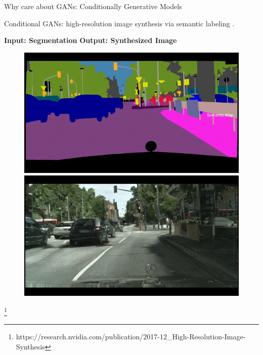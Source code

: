 \documentclass[notheorems]{beamer}
\newcommand{\source}[1]{{\let\thefootnote\relax\footnote{{\tiny #1}}}}
\begin{document}
    \begin{frame}{Why care about GANs: Conditionally Generative Models}

        \begin{center} Conditional GANs: high-resolution image synthesis via semantic labeling \cite{wang2018high}. \end{center}

        \begin{center} \hspace{0.5cm} \textbf{Input: Segmentation} \hspace{0.5cm} \textbf{Output: Synthesized Image} \end{center}

        \begin{figure}
            \centering
            \begin{minipage}{.45\textwidth}
                \centering
                \includegraphics[width=1\textwidth]{figures/condit_gen/frame_00}
            \end{minipage}
            \begin{minipage}{.45\textwidth}
                \centering
                \includegraphics[width=1\textwidth]{figures/condit_gen/frame_58}
            \end{minipage}
        \end{figure}

        \source{https://research.nvidia.com/publication/2017-12\_High-Resolution-Image-Synthesis}

    \end{frame}
\end{document}
